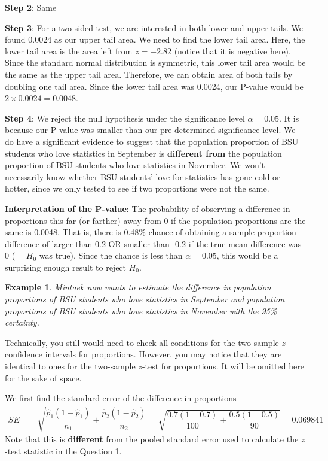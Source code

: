 \documentclass[12pt]{article}
\newcounter{lecnum}
\newtheorem{example}{Example}[lecnum]
\begin{document}
\noindent \textbf{Step 2}: Same

\noindent \textbf{Step 3}: For a two-sided test, we are interested in both lower and upper tails. We found 0.0024 as our upper tail area. We need to find the lower tail area. Here, the lower tail area is the area left from $z = -2.82$ (notice that it is negative here). Since the standard normal distribution is symmetric, this lower tail area would be the same as the upper tail area. Therefore, we can obtain area of both tails by doubling one tail area. Since the lower tail area was 0.0024, our P-value would be $2 \times 0.0024 = 0.0048$.

\noindent \textbf{Step 4}: We reject the null hypothesis under the significance level $\alpha = 0.05$. It is because our P-value was smaller than our pre-determined significance level. We do have a significant evidence to suggest that the population proportion of BSU students who love statistics in September is \textbf{different from} the population proportion of BSU students who love statistics in November. We won't necessarily know whether BSU students' love for statistics has gone cold or hotter, since we only tested to see if two proportions were not the same.

\noindent \textbf{Interpretation of the P-value}: The probability of observing a difference in proportions this far (or farther) away from 0 if the population proportions are the same is 0.0048. That is, there is 0.48\% chance of obtaining a sample proportion difference of larger than 0.2 OR smaller than -0.2 if the true mean difference was 0 ($= H_0$ was true). Since the chance is less than $\alpha = 0.05$, this would be a surprising enough result to reject $H_0$.

\vspace{20 pt}

\begin{example} Mintaek now wants to estimate the difference in population proportions of BSU students who love statistics in September and population proportions of BSU students who love statistics in November with the 95\% certainty.
\end{example}
	
Technically, you still would need to check all conditions for the two-sample $z$-confidence intervals for proportions. However, you may notice that they are identical to ones for the two-sample $z$-test for proportions. It will be omitted here for the sake of space.

We first find the standard error of the difference in proportions
\begin{align*}
SE &= \sqrt{\dfrac{\hat{p}_1 (1 - \hat{p}_1)}{n_1} + \dfrac{\hat{p}_2 (1 - \hat{p}_2)}{n_2}} = \sqrt{\dfrac{0.7 (1 - 0.7)}{100} + \dfrac{0.5 (1 - 0.5)}{90}} = 0.069841
\end{align*}
Note that this is \textbf{different} from the pooled standard error used to calculate the $z$-test statistic in the Question 1.
\end{document}
